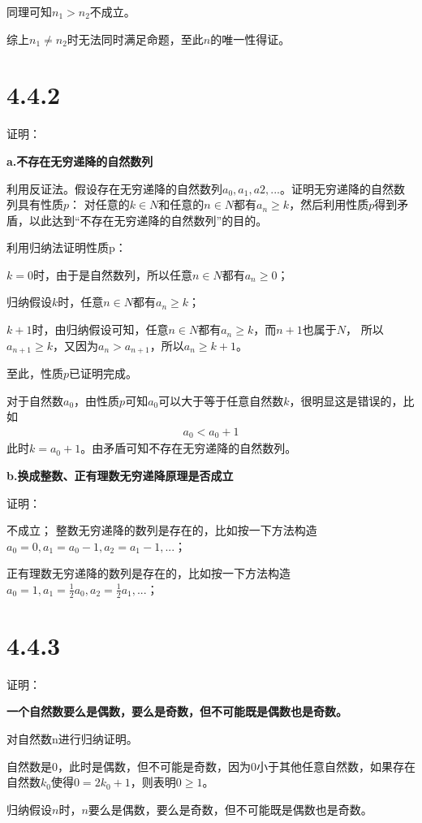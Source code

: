 \documentclass{article}
\theoremstyle{mystyle}
\begin{document}
同理可知$n_1 > n_2$不成立。

综上$n_1 \neq n_2$时无法同时满足命题，至此$n$的唯一性得证。

\section*{4.4.2}

证明：

\textbf{a.不存在无穷递降的自然数列}

利用反证法。假设存在无穷递降的自然数列$a_0,a_1,a2,...$。证明无穷递降的自然数列具有性质$p$：
对任意的$k \in N$和任意的$n \in N$都有$a_n \geq k$，然后利用性质$p$得到矛盾，以此达到“不存在无穷递降的自然数列”的目的。

利用归纳法证明性质p：

$k=0$时，由于是自然数列，所以任意$n \in N$都有$a_n \geq 0$；

归纳假设$k$时，任意$n \in N$都有$a_n \geq k$；

$k+1$时，由归纳假设可知，任意$n \in N$都有$a_n \geq k$，而$n+1$也属于$N$，
所以$a_{n+1} \geq k$，又因为$a_n > a_{n+1}$，所以$a_n \geq k+1$。

至此，性质$p$已证明完成。

对于自然数$a_0$，由性质$p$可知$a_0$可以大于等于任意自然数$k$，很明显这是错误的，比如
\begin{align*}
  a_0 < a_0 + 1
\end{align*}
此时$k=a_0 + 1$。由矛盾可知不存在无穷递降的自然数列。

\textbf{b.换成整数、正有理数无穷递降原理是否成立}

证明：

不成立；
整数无穷递降的数列是存在的，比如按一下方法构造$a_0=0,a_1=a_0-1,a_2=a_1-1,...$；

正有理数无穷递降的数列是存在的，比如按一下方法构造$a_0=1,a_1=\frac{1}{2}a_0,a_2=\frac{1}{2}a_1,...$；


\section*{4.4.3}

证明：

\textbf{一个自然数要么是偶数，要么是奇数，但不可能既是偶数也是奇数。}

对自然数n进行归纳证明。

自然数是$0$，此时是偶数，但不可能是奇数，因为$0$小于其他任意自然数，如果存在自然数$k_0$使得$0=2k_0+1$，则表明$0 \geq 1$。

归纳假设$n$时，$n$要么是偶数，要么是奇数，但不可能既是偶数也是奇数。
\end{document}
